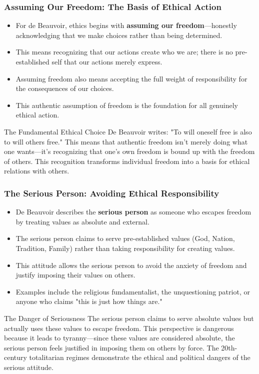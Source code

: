 \documentclass[aspectratio=169]{beamer}
\begin{document}
		\begin{frame}
			\frametitle{Assuming Our Freedom: The Basis of Ethical Action}
			\begin{itemize}
				\item For de Beauvoir, ethics begins with \textbf{assuming our freedom}—honestly acknowledging that we make choices rather than being determined.
				\item This means recognizing that our actions create who we are; there is no pre-established self that our actions merely express.
				\item Assuming freedom also means accepting the full weight of responsibility for the consequences of our choices.
				\item This authentic assumption of freedom is the foundation for all genuinely ethical action.
			\end{itemize}
			
			\begin{alertblock}{The Fundamental Ethical Choice}
				De Beauvoir writes: "To will oneself free is also to will others free." This means that authentic freedom isn't merely doing what one wants—it's recognizing that one's own freedom is bound up with the freedom of others. This recognition transforms individual freedom into a basis for ethical relations with others.
			\end{alertblock}
		\end{frame}
		
		\begin{frame}
			\frametitle{The Serious Person: Avoiding Ethical Responsibility}
			\begin{itemize}
				\item De Beauvoir describes the \textbf{serious person} as someone who escapes freedom by treating values as absolute and external.
				\item The serious person claims to serve pre-established values (God, Nation, Tradition, Family) rather than taking responsibility for creating values.
				\item This attitude allows the serious person to avoid the anxiety of freedom and justify imposing their values on others.
				\item Examples include the religious fundamentalist, the unquestioning patriot, or anyone who claims "this is just how things are."
			\end{itemize}
			
			\begin{exampleblock}{The Danger of Seriousness}
				The serious person claims to serve absolute values but actually uses these values to escape freedom. This perspective is dangerous because it leads to tyranny—since these values are considered absolute, the serious person feels justified in imposing them on others by force. The 20th-century totalitarian regimes demonstrate the ethical and political dangers of the serious attitude.
			\end{exampleblock}
		\end{frame}
		
\end{document}
